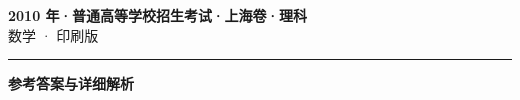 \documentclass[zihao=5, a4paper]{ctexart}
\begin{document}
\begin{center}
  {\Large\bfseries 2010 年·普通高等学校招生考试·上海卷·理科}\\[4pt]
  {\large 数学 · 印刷版}
\end{center}
\medskip
{}

\par\bigskip\hrule\bigskip
{}
\begin{center}{\large\bfseries 参考答案与详细解析}\end{center}
\smallskip

\end{document}
